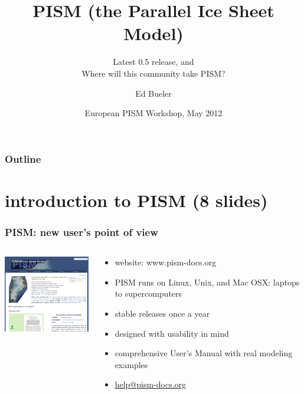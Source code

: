 \documentclass[hide notes,intlimits]{beamer}
\title[PISM (the Parallel Ice Sheet Model)] %
{PISM (the Parallel Ice Sheet Model)}
\subtitle{Latest 0.5 release, and \\ Where will this community take PISM?}
\author[Bueler]{Ed Bueler}
\institute{
University of Alaska Fairbanks
}
\date{European PISM Workshop, May 2012}
\begin{document}


{
} 

\begin{frame}
  \titlepage
\end{frame}

{
}

\begin{frame}
   \frametitle{Outline}
   \tableofcontents[subsectionstyle=hide/hide/hide]
\end{frame}


\section[introduction]{introduction to PISM (8 slides)}

\begin{frame}
  \frametitle{PISM: new user's point of view}
  \begin{columns}
    \begin{column}{50mm}
      \includegraphics[width=50mm]{pismdocs.png}
    \end{column}
    \begin{column}{70mm}
      \begin{itemize}
      \item website: \alert{www.pism-docs.org}
      \item PISM runs on Linux, Unix, and Mac OSX: laptops to supercomputers
      \item stable releases once a year
      \item designed with usability in mind
      \item comprehensive User's Manual with real modeling examples
      \item \url{help@pism-docs.org}
      \end{itemize}
    \end{column}
  \end{columns}
\end{frame}
\end{document}
